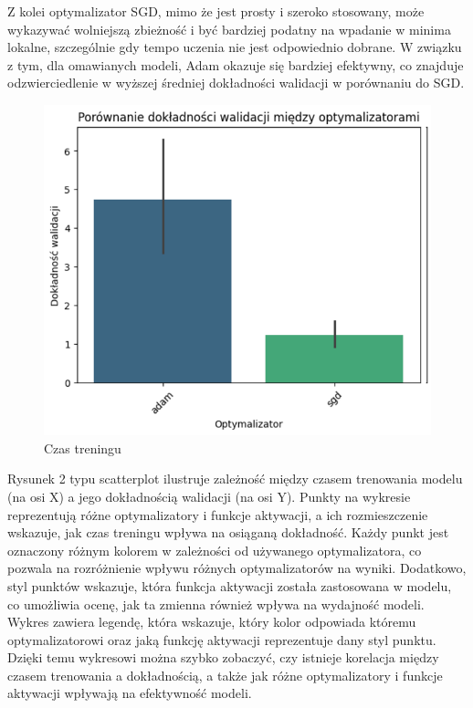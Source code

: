 \documentclass[polish,11pt,a4paper]{article}
\begin{document}
Z kolei optymalizator SGD, mimo że jest prosty i szeroko stosowany, może wykazywać wolniejszą zbieżność i być bardziej podatny na wpadanie w minima lokalne, szczególnie gdy tempo uczenia nie jest odpowiednio dobrane. W związku z tym, dla omawianych modeli, Adam okazuje się bardziej efektywny, co znajduje odzwierciedlenie w wyższej średniej dokładności walidacji w porównaniu do SGD.
\begin{figure}[ht]
	\centering
	\includegraphics[width=0.6\linewidth]{wal}
	\caption{Czas treningu}
	\label{fig:wal}
\end{figure}
Rysunek 2 typu scatterplot ilustruje zależność między czasem trenowania modelu (na osi X) a jego dokładnością walidacji (na osi Y). Punkty na wykresie reprezentują różne optymalizatory i funkcje aktywacji, a ich rozmieszczenie wskazuje, jak czas treningu wpływa na osiąganą dokładność. Każdy punkt jest oznaczony różnym kolorem w zależności od używanego optymalizatora, co pozwala na rozróżnienie wpływu różnych optymalizatorów na wyniki. Dodatkowo, styl punktów wskazuje, która funkcja aktywacji została zastosowana w modelu, co umożliwia ocenę, jak ta zmienna również wpływa na wydajność modeli. Wykres zawiera legendę, która wskazuje, który kolor odpowiada któremu optymalizatorowi oraz jaką funkcję aktywacji reprezentuje dany styl punktu. Dzięki temu wykresowi można szybko zobaczyć, czy istnieje korelacja między czasem trenowania a dokładnością, a także jak różne optymalizatory i funkcje aktywacji wpływają na efektywność modeli.
\end{document}
